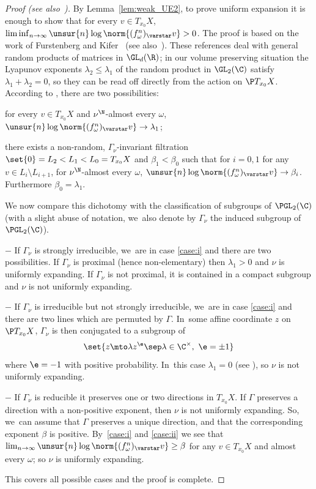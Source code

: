 \begin{proof}[Proof (see also~\cite{Prohaska-Sert:TAMS})]
By Lemma~\ref{lem:weak_UE2}, to prove uniform expansion it is enough to show that for every $ v\in T_{x_0}X$, $\liminf_{n\to\infty}\unsur{n}\log \norm{(f_\omega^n)_\varstar v} >0$.
The proof is based on the work of Furstenberg and Kifer~\cite{furstenberg-kifer} (see also~\cite[\S 3.7]{bougerol-lacroix}). These references deal with general random products of matrices in $\GL_d(\R)$; in our volume preserving situation the Lyapunov exponents $\lambda_2\leq \lambda_1$ of the random
product in $\GL_2(\C)$
satisfy $\lambda_1+\lambda_2=0$, so they can be read off directly from the action
on
$\P T_{x_0}X$. According to \cite[Th.\,3.5 \& 3.9]{furstenberg-kifer}, there are two possibilities:
\begin{enumeratei}
\item\label{case:i} for every $ v\in T_{x_0}X$ and $\nu^\N$-almost every $\omega$, $\unsur{n}\log \norm{(f_\omega^n)_\varstar v} \to \lambda_1$;
\item\label{case:ii} there
exists a
non-random, $\Gamma_\nu$-invariant filtration $\set{0}=L_2< L_1< L_0 = T_{x_0}X$
and $\beta_1<\beta_0$
such that for $i=0,1$ for any $ v\in L_{i}\setminus L_{i+1}$, for $\nu^\N$-almost every $\omega$,
$\unsur{n}\log \norm{(f_\omega^n)_\varstar v} \to \beta_i$. Furthermore $\beta_0= \lambda_1$.
\end{enumeratei}
We now compare this dichotomy with the classification of subgroups of $\PGL_2(\C)$ (with a slight abuse of notation, we~also denote by $\Gamma_\nu$ the induced subgroup of $\PGL_2(\C)$).

$-$ If $\Gamma_\nu$ is strongly irreducible, we~are in case \eqref{case:i} and there are two possibilities.
If $\Gamma_\nu$ is proximal (hence non-elementary)
then $\lambda_1>0$ and $\nu$ is uniformly expanding. If $\Gamma_\nu$ is not proximal, it is contained in a
compact subgroup and $\nu$ is not uniformly expanding.

$-$ If $\Gamma_\nu$ is irreducible but not strongly irreducible, we~are in case \eqref{case:i} and there are two lines which are permuted by $\Gamma$. In~some affine coordinate $z$ on $\P T_{x_0}X$, $\Gamma_\nu$ is then conjugated to a subgroup of
\begin{equation*}
\set{z\mto \lambda z^{\e}\sep \lambda\in \C^\times, \ \e = \pm 1}
\end{equation*} where $\e=- 1$ with positive probability. In~this case $\lambda_1 = 0$ (see \eg \cite[Prop.\,5.3]{degenerations_SL2}), so $\nu$ is not uniformly expanding.

$-$ If $\Gamma_\nu$ is reducible it preserves one or two directions in $T_{x_0}X$. If $\Gamma$ preserves a direction with a non-positive exponent, then $\nu$ is not uniformly expanding. So, we~can assume that $\Gamma$ preserves a unique direction, and that the corresponding exponent $\beta$ is positive. By~\eqref{case:i} and \eqref{case:ii} we see that $\lim_{n\to\infty}\unsur{n}\log \norm{(f^n_\omega)_\varstar v}\geq \beta$ for any $ v\in T_{x_0}X$ and almost every $\omega$; so
$\nu$ is uniformly expanding.

This covers all possible cases and the proof is complete.
\end{proof}

